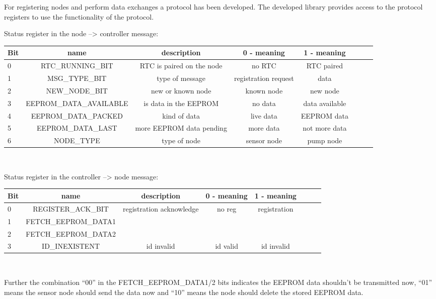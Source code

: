 For registering nodes and perform data exchanges a protocol has been developed. The developed library provides access to the protocol registers to use the functionality of the protocol.


Status register in the node --> controller message:

\begin{table}[htbp]
        \small
        \setlength\tabcolsep{2pt}
\begin{tabular}{ l c c c c c c r }
  Bit & name & description & 0 - meaning & 1 - meaning\\ \hline
  0 & RTC\_RUNNING\_BIT & RTC is paired on the node & no RTC & RTC paired \\ \hline
  1 & MSG\_TYPE\_BIT & type of message & registration request & data \\ \hline
  2 & NEW\_NODE\_BIT & new or known node & known node & new node \\ \hline
  3 & EEPROM\_DATA\_AVAILABLE & is data in the EEPROM & no data & data available\\ \hline
  4 & EEPROM\_DATA\_PACKED & kind of data & live data & EEPROM data\\ \hline
  5 & EEPROM\_DATA\_LAST & more EEPROM data pending & more data & not more data \\ \hline
  6 & NODE\_TYPE & type of node & sensor node & pump node\\ \hline
\end{tabular}\\
\end{table}


Status register in the controller --> node message:


\begin{table}[htbp]
        \small
        \setlength\tabcolsep{2pt}
\begin{tabular}{ l c c c c c c r }
  Bit & name & description & 0 - meaning & 1 - meaning\\ \hline
  0 & REGISTER\_ACK\_BIT & registration acknowledge & no reg & registration\\ \hline
  1 & FETCH\_EEPROM\_DATA1 & &  &  \\ \hline
  2 & FETCH\_EEPROM\_DATA2 &  & &  \\ \hline
  3 & ID\_INEXISTENT & id invalid & id valid & id invalid\\ \hline
\end{tabular}\\
\end{table}

Further the combination ``00'' in the FETCH\_EEPROM\_DATA1/2 bits indicates the EEPROM data shouldn't be transmitted now, ``01'' means the sensor node should send the data now and ``10'' means the node should delete the stored EEPROM data.
